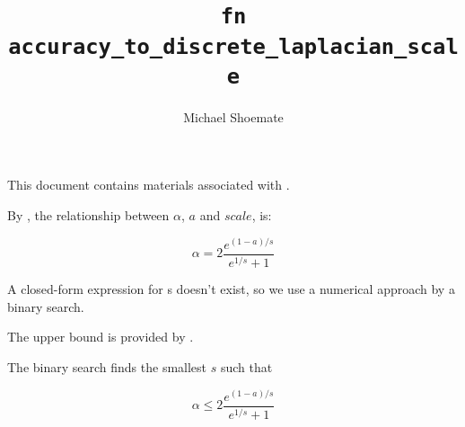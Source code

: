\documentclass{article}
\title{\texttt{fn accuracy\_to\_discrete\_laplacian\_scale}}
\author{Michael Shoemate}
\begin{document}
\maketitle

This document contains materials associated with .

By , 
the relationship between $\alpha$, $a$ and $scale$, is:

\begin{equation*}
    \alpha = 2 \frac{e^{(1 - a)/s}}{e^{1/s} + 1}
\end{equation*}

A closed-form expression for s doesn't exist, 
so we use a numerical approach by a binary search.

The upper bound is provided by .

The binary search finds the smallest $s$ such that

\begin{equation*}
    \alpha \le 2 \frac{e^{(1 - a)/s}}{e^{1/s} + 1}
\end{equation*}
\end{document}
